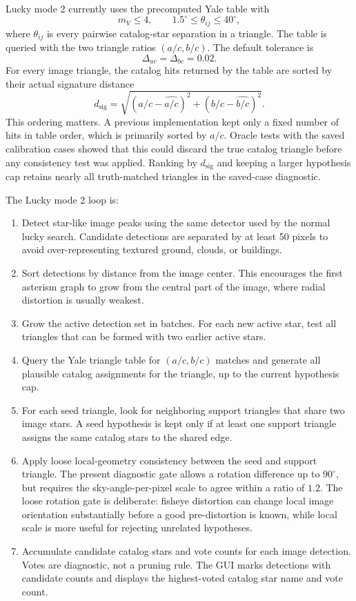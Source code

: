 \documentclass[11pt]{article}
\begin{document}
Lucky mode 2 currently uses the precomputed Yale table with
\[
  m_V \le 4,\qquad
  1.5^\circ \le \theta_{ij} \le 40^\circ ,
\]
where \(\theta_{ij}\) is every pairwise catalog-star separation in a triangle.
The table is queried with the two triangle ratios \((a/c,b/c)\). The default
tolerance is
\[
  \Delta_{ac}=\Delta_{bc}=0.02 .
\]
For every image triangle, the catalog hits returned by the table are sorted by
their actual signature distance
\begin{equation}
  d_{\mathrm{sig}} =
  \sqrt{(a/c-\widehat{a/c})^2 + (b/c-\widehat{b/c})^2}.
\end{equation}
This ordering matters. A previous implementation kept only a fixed number of
hits in table order, which is primarily sorted by \(a/c\). Oracle tests with
the saved calibration cases showed that this could discard the true catalog
triangle before any consistency test was applied. Ranking by
\(d_{\mathrm{sig}}\) and keeping a larger hypothesis cap retains nearly all
truth-matched triangles in the saved-case diagnostic.

The Lucky mode 2 loop is:
\begin{enumerate}
  \item Detect star-like image peaks using the same detector used by the normal
        lucky search. Candidate detections are separated by at least 50 pixels
        to avoid over-representing textured ground, clouds, or buildings.
  \item Sort detections by distance from the image center. This encourages the
        first asterism graph to grow from the central part of the image, where
        radial distortion is usually weakest.
  \item Grow the active detection set in batches. For each new active star,
        test all triangles that can be formed with two earlier active stars.
  \item Query the Yale triangle table for \((a/c,b/c)\) matches and generate
        all plausible catalog assignments for the triangle, up to the current
        hypothesis cap.
  \item For each seed triangle, look for neighboring support triangles that
        share two image stars. A seed hypothesis is kept only if at least one
        support triangle assigns the same catalog stars to the shared edge.
  \item Apply loose local-geometry consistency between the seed and support
        triangle. The present diagnostic gate allows a rotation difference up
        to \(90^\circ\), but requires the sky-angle-per-pixel scale to agree
        within a ratio of \(1.2\). The loose rotation gate is deliberate:
        fisheye distortion can change local image orientation substantially
        before a good pre-distortion is known, while local scale is more useful
        for rejecting unrelated hypotheses.
  \item Accumulate candidate catalog stars and vote counts for each image
        detection. Votes are diagnostic, not a pruning rule. The GUI marks
        detections with candidate counts and displays the highest-voted catalog
        star name and vote count.
\end{enumerate}
\end{document}
